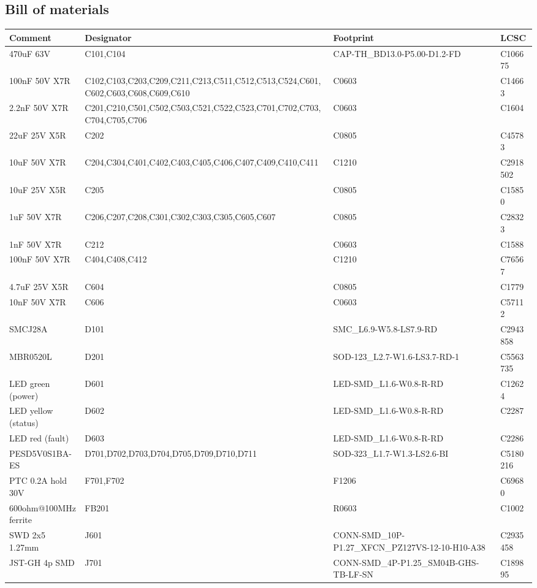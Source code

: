 \documentclass[11pt,a4paper]{article}
\begin{document}
\subsection*{Bill of materials}
{\small
\begin{longtable}{p{4.4cm}p{2.8cm}p{4.6cm}l}
\toprule
\textbf{Comment} & \textbf{Designator} & \textbf{Footprint} & \textbf{LCSC} \\
\midrule
\endhead
470uF 63V & C101,C104 & CAP-TH\_BD13.0-P5.00-D1.2-FD & C106675 \\
100nF 50V X7R & C102,C103,C203,C209,C211,C213,C511,C512,C513,C524,C601,C602,C603,C608,C609,C610 & C0603 & C14663 \\
2.2nF 50V X7R & C201,C210,C501,C502,C503,C521,C522,C523,C701,C702,C703,C704,C705,C706 & C0603 & C1604 \\
22uF 25V X5R & C202 & C0805 & C45783 \\
10uF 50V X7R & C204,C304,C401,C402,C403,C405,C406,C407,C409,C410,C411 & C1210 & C2918502 \\
10uF 25V X5R & C205 & C0805 & C15850 \\
1uF 50V X7R & C206,C207,C208,C301,C302,C303,C305,C605,C607 & C0805 & C28323 \\
1nF 50V X7R & C212 & C0603 & C1588 \\
100nF 50V X7R & C404,C408,C412 & C1210 & C76567 \\
4.7uF 25V X5R & C604 & C0805 & C1779 \\
10nF 50V X7R & C606 & C0603 & C57112 \\
SMCJ28A & D101 & SMC\_L6.9-W5.8-LS7.9-RD & C2943858 \\
MBR0520L & D201 & SOD-123\_L2.7-W1.6-LS3.7-RD-1 & C5563735 \\
LED green (power) & D601 & LED-SMD\_L1.6-W0.8-R-RD & C12624 \\
LED yellow (status) & D602 & LED-SMD\_L1.6-W0.8-R-RD & C2287 \\
LED red (fault) & D603 & LED-SMD\_L1.6-W0.8-R-RD & C2286 \\
PESD5V0S1BA-ES & D701,D702,D703,D704,D705,D709,D710,D711 & SOD-323\_L1.7-W1.3-LS2.6-BI & C5180216 \\
PTC 0.2A hold 30V & F701,F702 & F1206 & C69680 \\
600ohm@100MHz ferrite & FB201 & R0603 & C1002 \\
SWD 2x5 1.27mm & J601 & CONN-SMD\_10P-P1.27\_XFCN\_PZ127VS-12-10-H10-A38 & C2935458 \\
JST-GH 4p SMD & J701 & CONN-SMD\_4P-P1.25\_SM04B-GHS-TB-LF-SN & C189895 \\

\end{longtable}}
\end{document}
